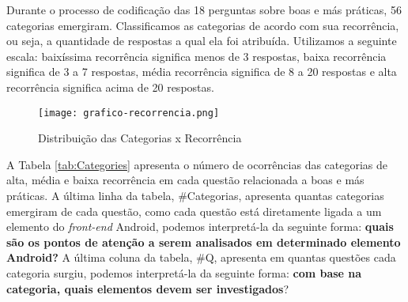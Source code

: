 Durante o processo de codifica\c{c}\~ao das 18 perguntas sobre boas e m\'as pr\'aticas, 56 categorias emergiram. Classificamos as categorias de acordo com sua recorr\^encia, ou seja, a quantidade de respostas a qual ela foi atribu\'ida. Utilizamos a seguinte escala: baix\'issima recorr\^encia significa menos de 3 respostas, baixa recorr\^encia significa de 3 a 7 respostas, m\'edia recorr\^encia significa de 8 a 20 respostas e alta recorr\^encia significa acima de 20 respostas.

\begin{figure}[!htb]
	\centering
	\texttt{[image: grafico-recorrencia.png]}
	\caption{Distribui\c{c}\~ao das Categorias x Recorr\^encia}
	\label{fig:CategoriaXRecorrencia}
\end{figure}


A Tabela \ref{tab:Categories} apresenta o n\'umero de ocorr\^encias das categorias de alta, m\'edia e baixa recorr\^encia em cada quest\~ao relacionada a boas e m\'as pr\'aticas. A \'ultima linha da tabela, \#Categorias, apresenta quantas categorias emergiram de cada quest\~ao, como cada quest\~ao est\'a diretamente ligada a um elemento do \textit{front-end} Android, podemos interpret\'a-la da seguinte forma: \textbf{quais s\~ao os pontos de aten\c{c}\~ao a serem analisados em determinado elemento Android?} A \'ultima coluna da tabela, \#Q, apresenta em quantas quest\~oes cada categoria surgiu, podemos interpret\'a-la da seguinte forma: \textbf{com base na categoria, quais elementos devem ser investigados}?



